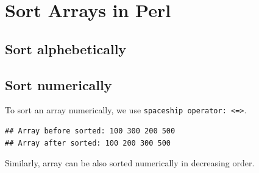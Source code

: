 \documentclass[]{book}
\makeatletter
\newenvironment{Shaded}{\begin{snugshade}}{\end{snugshade}}
\newcommand{\KeywordTok}[1]{\textcolor[rgb]{0.13,0.29,0.53}{\textbf{#1}}}
\newcommand{\DataTypeTok}[1]{\textcolor[rgb]{0.13,0.29,0.53}{#1}}
\newcommand{\DecValTok}[1]{\textcolor[rgb]{0.00,0.00,0.81}{#1}}
\newcommand{\CharTok}[1]{\textcolor[rgb]{0.31,0.60,0.02}{#1}}
\newcommand{\StringTok}[1]{\textcolor[rgb]{0.31,0.60,0.02}{#1}}
\newcommand{\FunctionTok}[1]{\textcolor[rgb]{0.00,0.00,0.00}{#1}}
\newcommand{\NormalTok}[1]{#1}
\newenvironment{kframe}{%
\medskip{}
\setlength{\fboxsep}{.8em}
 \def\at@end@of@kframe{}%
 \ifinner\ifhmode%
  \def\at@end@of@kframe{\end{minipage}}%
  \begin{minipage}{\columnwidth}%
 \fi\fi%
 \def\FrameCommand##1{\hskip\@totalleftmargin \hskip-\fboxsep
 \colorbox{shadecolor}{##1}\hskip-\fboxsep
     \hskip-\linewidth \hskip-\@totalleftmargin \hskip\columnwidth}%
 \MakeFramed {\advance\hsize-\width
   \@totalleftmargin\z@ \linewidth\hsize
   \@setminipage}}%
 {\par\unskip\endMakeFramed%
 \at@end@of@kframe}
\renewenvironment{Shaded}{\begin{kframe}}{\end{kframe}}
\theoremstyle{definition}
\theoremstyle{definition}
\theoremstyle{definition}
\theoremstyle{remark}
\makeatother
\begin{document}
\section{Sort Arrays in Perl}\label{sort-arrays-in-perl}

\subsection{Sort alphebetically}\label{sort-alphebetically}

\subsection{Sort numerically}\label{sort-numerically}

To sort an array numerically, we use
\texttt{spaceship\ operator:\ \textless{}=\textgreater{}}.

\begin{Shaded}
\end{Shaded}

\begin{verbatim}
## Array before sorted: 100 300 200 500
## Array after sorted: 100 200 300 500
\end{verbatim}

Similarly, array can be also sorted numerically in decreasing order.
\end{document}
